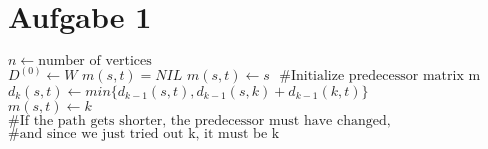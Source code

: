 \documentclass{article}
\begin{document}
\section*{Aufgabe 1}

\begin{algorithm}
\begin{algorithmic}[5]

\State $ n \gets \text{number of vertices}$ \\
\State $D^{(0)} \gets W$ 
\State $m(s,t) = NIL$
\Else  
\State $m(s,t) \gets s$
\State $\text{ \#Initialize predecessor matrix m}$
\EndIf
\EndFor
\EndFor
{}
\State $d_k(s,t) \gets min\{d_{k-1}(s,t), d_{k-1}(s,k) + d_{k-1}(k,t)\}$\\
\State $m(s,t) \gets k$ \\
\State $\text{\# If the path gets shorter, the predecessor must have changed,}$
\State $\text{\# and since we just tried out k, it must be k}$
\EndIf
\EndFor
\EndFor
\EndFor


\EndFunction

\end{algorithmic}
\end{algorithm}
\end{document}
